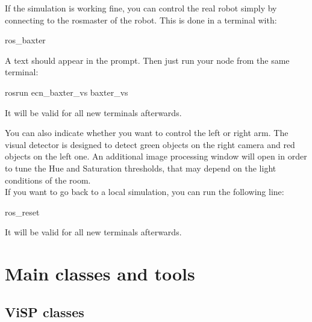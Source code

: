 \documentclass{ecnreport}
\begin{document}
If the simulation is working fine, you can control the real robot simply by connecting to the rosmaster of the robot. This is done in a terminal with:
\begin{bashcodelarge}
 ros_baxter
\end{bashcodelarge}A \okt{[baxter]} text should appear in the prompt.
Then just run your node from the same terminal:
\begin{bashcodelarge}
 rosrun ecn_baxter_vs baxter_vs
\end{bashcodelarge} It will be valid for all new terminals afterwards.

You can also indicate whether you want to control the left or right arm. The visual detector is designed to detect green objects on the right camera and red objects on the left one. An additional image processing window will open in order to tune the Hue and Saturation thresholds, that may depend on the light conditions of the room.\\

If you want to go back to a local simulation, you can run the following line:
\begin{bashcodelarge}
 ros_reset
\end{bashcodelarge} It will be valid for all new terminals afterwards.


\appendix

\section{Main classes and tools}\label{sec:classes}

\subsection{ViSP classes}
\end{document}

